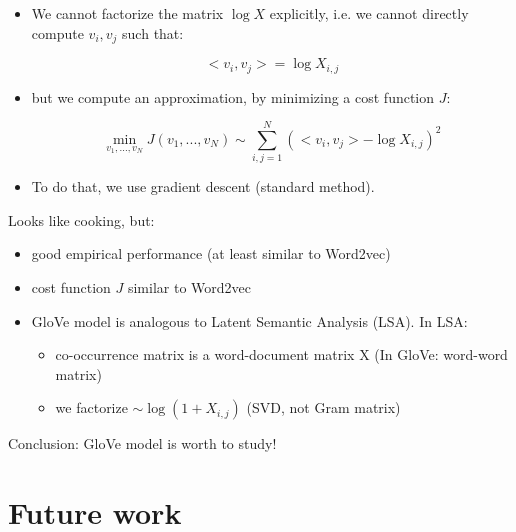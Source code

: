 \documentclass{beamer}
\begin{document}
\begin{frame}
\begin{itemize}
\item We cannot factorize the matrix $\log X$ explicitly, i.e. we cannot directly compute $v_i,v_j$ such that:

\[ <v_i,v_j> = \log X_{i,j} \]


\item but we compute an approximation, by minimizing a cost function $J$:

\[  \min_{v_1,...,v_N}  J(v_1,...,v_N) \sim  \sum_{i,j=1}^N  \left( <v_i,v_j> - \log X_{i,j}    \right)^2   \]

\item To do that, we use gradient descent (standard method).
  
\end{itemize}
\end{frame}

\begin{frame}
Looks like cooking, but:
\begin{itemize}
\item good empirical performance (at least similar to Word2vec)
\item cost function $J$ similar to Word2vec
\item GloVe model is analogous to Latent Semantic Analysis (LSA). In LSA:
\begin{itemize}
\item co-occurrence matrix is a word-document matrix X (In GloVe: word-word matrix)
\item we factorize $\sim \log (1+X_{i,j}) $ (SVD, not Gram matrix)
\end{itemize}

\end{itemize}

\bigskip

Conclusion: GloVe model is worth to study!

\end{frame}



\section{Future work}
\end{document}
